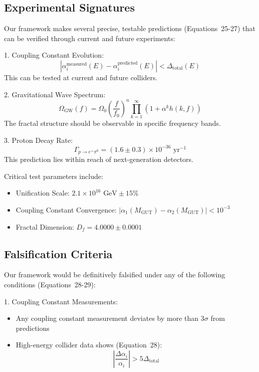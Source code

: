 \documentclass{article}
\begin{document}
\subsection{Experimental Signatures}

Our framework makes several precise, testable predictions (Equations~25-27) that can be verified through current and future experiments:

1. Coupling Constant Evolution:
   \begin{equation}
   |\alpha_i^{\text{measured}}(E) - \alpha_i^{\text{predicted}}(E)| < \Delta_{\text{total}}(E)
   \end{equation}
   This can be tested at current and future colliders.

2. Gravitational Wave Spectrum:
   \begin{equation}
   \Omega_{\text{GW}}(f) = \Omega_0\left(\frac{f}{f_0}\right)^n \prod_{k=1}^{\infty} \left(1 + \alpha^k h(k,f)\right)
   \end{equation}
   The fractal structure should be observable in specific frequency bands.

3. Proton Decay Rate:
   \begin{equation}
   \Gamma_{p\to e^+\pi^0} = (1.6 \pm 0.3) \times 10^{-36} \text{ yr}^{-1}
   \end{equation}
   This prediction lies within reach of next-generation detectors.

Critical test parameters include:

\begin{itemize}
\item Unification Scale: $2.1 \times 10^{16} \text{ GeV} \pm 15\%$
\item Coupling Constant Convergence: $|\alpha_1(M_{\text{GUT}}) - \alpha_2(M_{\text{GUT}})| < 10^{-3}$
\item Fractal Dimension: $D_f = 4.0000 \pm 0.0001$
\end{itemize}

\subsection{Falsification Criteria}

Our framework would be definitively falsified under any of the following conditions (Equations~28-29):

1. Coupling Constant Measurements:
   \begin{itemize}
   \item Any coupling constant measurement deviates by more than $3\sigma$ from predictions
   \item High-energy collider data shows (Equation~28):
     \begin{equation}
     \left|\frac{\Delta\alpha_i}{\alpha_i}\right| > 5\Delta_{\text{total}}
     \end{equation}
   \end{itemize}
\end{document}
